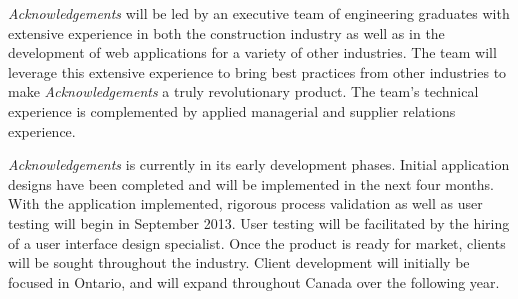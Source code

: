 {\it Acknowledgements} will be led by an executive team of engineering graduates with extensive experience in both the construction industry as well as in the development of web applications for a variety of other industries. The team will leverage this extensive experience to bring best practices from other industries to make {\it Acknowledgements} a truly revolutionary product. The team's technical experience is complemented by applied managerial and supplier relations experience. 

{\it Acknowledgements} is currently in its early development phases. Initial application designs have been completed and will be implemented in the next four months. With the application implemented, rigorous process validation as well as user testing will begin in September 2013. User testing will be facilitated by the hiring of a user interface design specialist. Once the product is ready for market, clients will be sought throughout the industry. Client development will initially be focused in Ontario, and will expand throughout Canada over the following year.